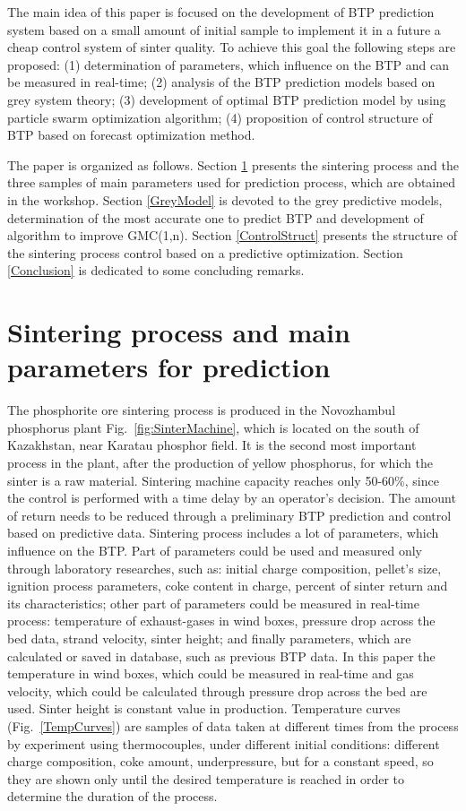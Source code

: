 \documentclass[AMS,STIX2COL]{WileyNJD-v2}
\begin{document}
The main idea of this paper is focused on the development of BTP prediction system based on a small amount of initial sample to implement it in a future a cheap control system of sinter quality. To achieve this goal the following steps are proposed: (1) determination of parameters, which influence on the BTP and can be measured in real-time; (2) analysis of the BTP prediction models based on grey system theory; (3) development of optimal BTP prediction model by using particle swarm optimization algorithm; (4) proposition of control structure of BTP based on forecast optimization method.

The paper is organized as follows. Section \ref{SintProcess} presents the sintering process and the three samples of main parameters used for prediction process, which are obtained in the workshop. Section \ref{GreyModel} is devoted to the grey predictive models, determination of the most accurate one to predict BTP and development of algorithm to improve GMC(1,n). Section \ref{ControlStruct} presents the structure of the sintering process control based on a predictive optimization. Section \ref{Conclusion} is dedicated to some concluding remarks.

\section{Sintering process and main parameters for prediction} \label{SintProcess}

The phosphorite ore sintering process is produced in the Novozhambul phosphorus plant Fig.~\ref{fig:SinterMachine}, which is located on the south of Kazakhstan, near Karatau phosphor field. It is the second most important process in the plant, after the production of yellow phosphorus, for which the sinter is a raw material.
Sintering machine capacity reaches only 50-60\%, since the control is performed with a time delay by an operator's decision. The amount of return needs to be reduced through a preliminary BTP prediction and control based on predictive data. 
Sintering process includes a lot of parameters, which influence on the BTP. Part of parameters could be used and measured only through laboratory researches, such as: initial charge composition, pellet's size, ignition process parameters, coke content in charge, percent of sinter return and its characteristics; other part of parameters could be measured in real-time process: temperature of exhaust-gases in wind boxes, pressure drop across the bed data, strand velocity, sinter height; and finally parameters, which are calculated or saved in database, such as previous BTP data. In this paper the temperature in wind boxes, which could be measured in real-time and gas velocity, which could be calculated through pressure drop across the bed are used. Sinter height is constant value in production.  Temperature curves (Fig.~\ref{TempCurves}) are samples of data taken at different times from the process by experiment using thermocouples, under different initial conditions: different charge composition, coke amount, underpressure, but for a constant speed, so they are shown only until the desired temperature is reached in order to determine the duration of the process.
\end{document}
